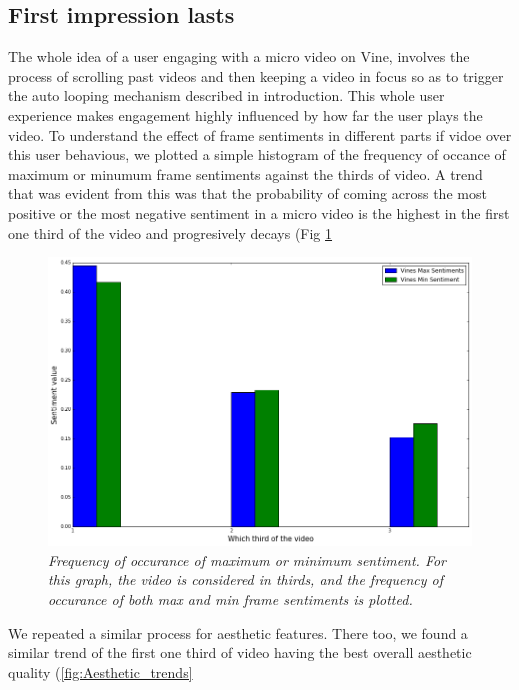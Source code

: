 \subsection{First impression lasts}
The whole idea of a user engaging with a micro video on Vine, involves the process of scrolling past videos and then keeping a video in focus so as to trigger the auto looping mechanism described in introduction. This whole user experience makes engagement highly influenced by how far the user plays the video. To understand the effect of frame sentiments in different parts if vidoe over this user behavious, we plotted a simple histogram of the frequency of occance of maximum or minumum frame sentiments against the thirds of video. A trend that was evident from this was that the probability of coming across the most positive or the most negative sentiment in a micro video is the highest in the first one third of the video and progresively decays (Fig \ref{fig:Senti_Thirds}

\begin{figure}[!htb]
\centering
\includegraphics[width=\columnwidth]{plots/SentimentsThirds}
\caption{\textsl{ Frequency of occurance of maximum or minimum sentiment. For this graph, the video is considered in thirds, and the frequency of occurance of both max and min frame sentiments is plotted. }}
\label{fig:Senti_Thirds}
\end{figure} 

We repeated a similar process for aesthetic features. There too, we found a similar trend of the first one third of video having the best overall aesthetic quality (\ref{fig:Aesthetic_trends}

